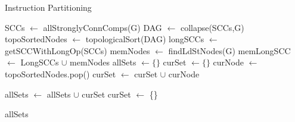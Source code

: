 \documentclass{sig-alternate}
\begin{document}
\begin{algorithm}[t]
  \caption{Instruction Partitioning}\label{algo1}
  \begin{algorithmic}[1]
    \State SCCs $\gets$ allStronglyConnComps(G)
  \State DAG $\gets$ collapse(SCCs,G)
  \State topoSortedNodes $\gets$ topologicalSort(DAG)
  \State longSCCs $\gets$ getSCCWithLongOp(SCCs)
  \State memNodes $\gets$ findLdStNodes(G)
  \State memLongSCC $\gets$ LongSCCs $\cup$ memNodes
  \State allSets $\gets \{\}$
  \State curSet $\gets \{\}$
     \State curNode $\gets$ topoSortedNodes.pop()
     \State curSet $\gets$ curSet $\cup$ curNode
    
    \State allSets $\gets$ allSets $\cup$ curSet
    \State curSet $\gets$ \{\}
     \EndIf

     
  \EndWhile
  \State \Return allSets 
  
    \EndProcedure
  

\end{algorithmic}
\end{algorithm}
\end{document}
